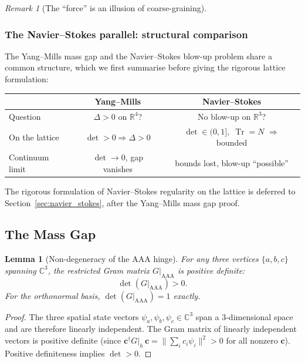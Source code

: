 \documentclass[12pt]{article}
\newtheorem{lemma}[theorem]{Lemma}
\theoremstyle{remark}
\newtheorem{remark}[theorem]{Remark}
\theoremstyle{definition}
\newcommand{\CC}{\mathbb{C}}
\newcommand{\RR}{\mathbb{R}}
\newcommand{\tr}{\operatorname{Tr}}
\begin{document}
\begin{remark}[The ``force'' is an illusion of coarse-graining]
\subsubsection{The Navier--Stokes parallel: structural comparison}
\label{sec:navier_stokes_parallel}

The Yang--Mills mass gap and the Navier--Stokes blow-up problem share
a common structure, which we first summarise before giving the
rigorous lattice formulation:

\begin{center}
\begin{tabular}{lcc}
\hline
& Yang--Mills & Navier--Stokes \\
\hline
Question & $\Delta > 0$ on $\RR^4$? & No blow-up on $\RR^3$? \\
On the lattice & $\det > 0 \Rightarrow \Delta > 0$ &
  $\det \in (0,1],\;\tr = N$ $\Rightarrow$ bounded \\
Continuum limit & $\det \to 0$, gap vanishes &
  bounds lost, blow-up ``possible'' \\
\hline
\end{tabular}
\end{center}

The rigorous formulation of Navier--Stokes regularity on the lattice
is deferred to Section~\ref{sec:navier_stokes}, after the Yang--Mills
mass gap proof.

\subsection{The Mass Gap}
\label{sec:massgap}

\begin{lemma}[Non-degeneracy of the AAA hinge]
\label{lem:det}
For any three vertices $\{a, b, c\}$ spanning $\CC^3$, the
restricted Gram matrix $G|_{\mathrm{AAA}}$ is positive definite:
\begin{equation}
\det(G|_{\mathrm{AAA}}) > 0.
\end{equation}
For the orthonormal basis, $\det(G|_{\mathrm{AAA}}) = 1$ exactly.
\end{lemma}

\begin{proof}
The three spatial state vectors $\psi_a, \psi_b, \psi_c \in \CC^3$
span a 3-dimensional space and are therefore linearly independent.
The Gram matrix of linearly independent vectors is positive definite
(since $\mathbf{c}^\dagger G|_h\, \mathbf{c} =
\|\sum_i c_i \psi_i\|^2 > 0$ for all nonzero $\mathbf{c}$).
Positive definiteness implies $\det > 0$.


\end{proof}
\end{remark}
\end{document}
